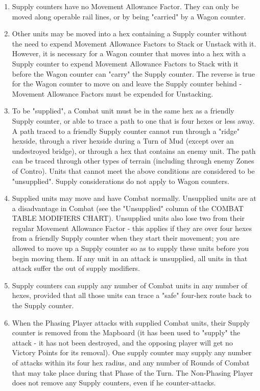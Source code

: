 \begin{enumerate}
  \item Supply counters have no Movement Allowance Factor. They can only be moved along operable rail lines, or by being "carried" by a Wagon counter.

  \item Other units may be moved into a hex containing a Supply counter without the need to expend Movement Allowance Factors to Stack or Unstack with it. However, it is necessary for a Wagon counter that moves into a hex with a Supply counter to expend Movement Allowance Factors to Stack with it before the Wagon counter can "carry" the Supply counter. The reverse is true for the Wagon counter to move on and leave the Supply counter behind - Movement Allowance Factors must be expended for Unstacking.

  \item To be "supplied", a Combat unit must be in the same hex as a friendly Supply counter, or able to trace a path to one that is four hexes or less away. A path traced to a friendly Supply counter cannot run through a "ridge" hexside, through a river hexside during a Turn of Mud (except over an undestroyed bridge), or through a hex that contains an enemy unit. The path can be traced through other types of terrain (including through enemy Zones of Contro). Units that cannot meet the above conditions are considered to be "unsupplied". Supply considerations do not apply to Wagon counters.

  \item Supplied units may move and have Combat normally. Unsupplied units are at a disadvantage in Combat (see the "Unsupplied" column of the COMBAT TABLE MODIFIERS CHART). Unsupplied units also lose two from their regular Movement Allowance Factor - this applies if they are over four hexes from a friendly Supply counter when they start their movement; you are allowed to move up a Supply counter so as to supply these units before you begin moving them. If any unit in an attack is unsupplied, all units in that attack suffer the out of supply modifiers.

  \item Supply counters can supply any number of Combat units in any number of hexes, provided that all those units can trace a "safe" four-hex route back to the Supply counter.

  \item When the Phasing Player attacks with supplied Combat units, their Supply counter is removed from the Mapboard (it has been used to "supply" the attack - it has not been destroyed, and the opposing player will get no Victory Points for its removal). One supply counter may supply any number of attacks within its four hex radius, and any number of Rounds of Combat that may take place during that Phase of the Turn. The Non-Phasing Player does not remove any Supply counters, even if he counter-attacks.


\end{enumerate}
